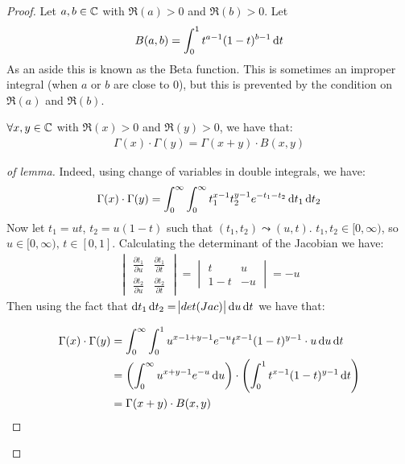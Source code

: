 \begin{proof}
Let $a,b \in \mathbb{C}$ with $\Re(a) > 0$ and $\Re(b) > 0$. Let
\begin{align*}
    B(a,b) = \int_0^1t^{a-1} (1-t)^{b-1} \dif t
\end{align*}
As an aside this is known as the Beta function. This is sometimes an improper integral (when $a$ or $b$ are close to $0$), but this is prevented by the condition on $\Re(a)$ and $\Re(b)$.\\

\begin{lemma}$ \forall x,y \in \mathbb{C}$ with $\Re(x) > 0$ and $\Re(y) > 0$, we have that:
\begin{align*}
    \Gamma(x) \cdot \Gamma(y) = \Gamma(x+y) \cdot B(x,y)
\end{align*}
\end{lemma}
\begin{proof}[of lemma]
Indeed, using change of variables in double integrals, we have:
\begin{align*}
    \Gamma(x) \cdot \Gamma(y) &= \int_0^\infty \int_0^\infty t_1^{x-1}t_2^{y-1}  e^{-t_1-t_2} \dif t_1 \dif t_2\\
\end{align*}
Now let $t_1 = ut$, $t_2 = u(1-t)$ such that $(t_1, t_2) \leadsto (u,t)$. $t_1, t_2 \in [0,\infty)$, so $u \in [0,\infty), \, t \in [0,1]$. Calculating the determinant of the Jacobian we have:
\begin{align*}
\begin{vmatrix} 
\frac{\partial t_1 }{\partial u} & \frac{\partial t_1 }{\partial t} \\[1ex]
\frac{\partial t_2}{\partial u} & \frac{\partial t_2}{\partial t}
\end{vmatrix} = 
\begin{vmatrix}
t & u\\
1-t & -u
\end{vmatrix} = -u
\end{align*}
Then using the fact that $\dif t_1 \dif t_2 = \abs{det(Jac)} \dif u \dif t$ we have that:

\begin{align*}
    \Gamma(x) \cdot \Gamma(y) &= \int_0^\infty \int_0^1 u^{x-1+y-1} e^{-u} t^{x-1} (1-t)^{y-1} \cdot u \dif u \dif t\\
    &= \br{\int_0^\infty u^{x+y-1} e^{-u} \dif u } \cdot \br{\int_0^1 t^{x-1} (1-t)^{y-1} \dif t}\\
    &= \Gamma(x+y) \cdot B(x,y)
\end{align*}
\end{proof}


\end{proof}
